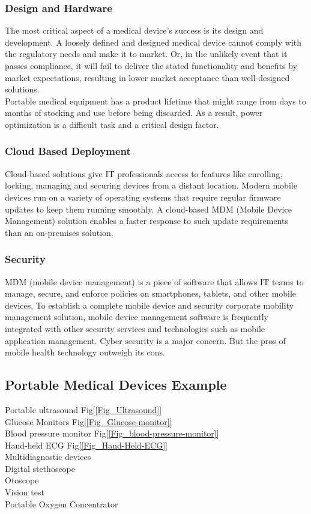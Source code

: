 \documentclass[12pt]{article}
\begin{document}
\subsubsection{Design and Hardware}
The most critical aspect of a medical device's success is its design and development. A loosely defined and designed medical device cannot comply with the regulatory needs and make it to market. Or, in the unlikely event that it passes compliance, it will fail to deliver the stated functionality and benefits by market expectations, resulting in lower market acceptance than well-designed solutions.
\\
Portable medical equipment has a product lifetime that might range from days to months of stocking and use before being discarded. As a result, power optimization is a difficult task and a critical design factor.
\subsubsection{Cloud Based Deployment}
Cloud-based solutions give IT professionals access to features like enrolling, locking, managing and securing devices from a distant location. Modern mobile devices run on a variety of operating systems that require regular firmware updates to keep them running smoothly. A cloud-based MDM (Mobile Device Management) solution enables a faster response to such update requirements than an on-premises solution.

\subsubsection{Security}
MDM (mobile device management) is a piece of software that allows IT teams to manage, secure, and enforce policies on smartphones, tablets, and other mobile devices. To establish a complete mobile device and security corporate mobility management solution, mobile device management software is frequently integrated with other security services and technologies such as mobile application management.
 Cyber security is a major concern. But the pros of mobile health technology outweigh its cons.

\subsection{Portable Medical  Devices Example }
 Portable ultrasound Fig[\ref{Fig_Ultrasound}]\\
 Glucose Monitors Fig[\ref{Fig_Glucose-monitor}]\\
 Blood pressure monitor Fig[\ref{Fig_blood-pressure-monitor}]\\
 Hand-held ECG Fig[\ref{Fig_Hand-Held-ECG}]\\
 Multidiagnostic devices\\
 Digital stethoscope\\
 Otoscope\\
 Vision test\\ 
 Portable Oxygen Concentrator
\end{document}
